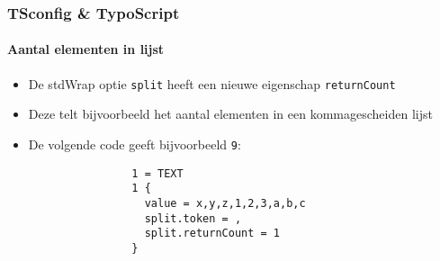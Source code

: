 
\begin{frame}[fragile]
	\frametitle{TSconfig \& TypoScript}
	\framesubtitle{Aantal elementen in lijst}

	\lstset{basicstyle=\tiny\ttfamily}

	\begin{itemize}

		\item De stdWrap optie \texttt{split} heeft een nieuwe eigenschap \texttt{returnCount}

		\item Deze telt bijvoorbeeld het aantal elementen in een kommagescheiden lijst

		\item De volgende code geeft bijvoorbeeld \texttt{9}:

			\begin{lstlisting}
				1 = TEXT
				1 {
				  value = x,y,z,1,2,3,a,b,c
				  split.token = ,
				  split.returnCount = 1
				}
			\end{lstlisting}

	\end{itemize}

\end{frame}


